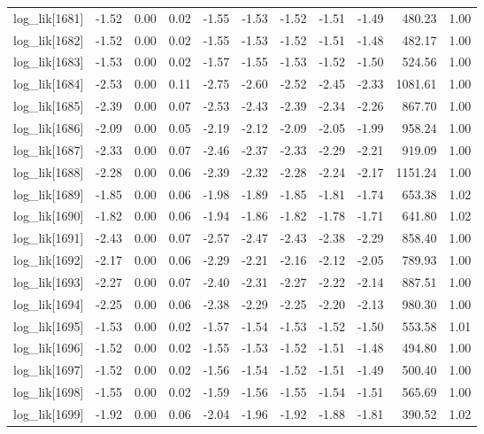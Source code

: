 \begin{table}[ht]
\begin{tabular}{rrrrrrrrrrr}
  log\_lik[1681] & -1.52 & 0.00 & 0.02 & -1.55 & -1.53 & -1.52 & -1.51 & -1.49 & 480.23 & 1.00 \\ 
  log\_lik[1682] & -1.52 & 0.00 & 0.02 & -1.55 & -1.53 & -1.52 & -1.51 & -1.48 & 482.17 & 1.00 \\ 
  log\_lik[1683] & -1.53 & 0.00 & 0.02 & -1.57 & -1.55 & -1.53 & -1.52 & -1.50 & 524.56 & 1.00 \\ 
  log\_lik[1684] & -2.53 & 0.00 & 0.11 & -2.75 & -2.60 & -2.52 & -2.45 & -2.33 & 1081.61 & 1.00 \\ 
  log\_lik[1685] & -2.39 & 0.00 & 0.07 & -2.53 & -2.43 & -2.39 & -2.34 & -2.26 & 867.70 & 1.00 \\ 
  log\_lik[1686] & -2.09 & 0.00 & 0.05 & -2.19 & -2.12 & -2.09 & -2.05 & -1.99 & 958.24 & 1.00 \\ 
  log\_lik[1687] & -2.33 & 0.00 & 0.07 & -2.46 & -2.37 & -2.33 & -2.29 & -2.21 & 919.09 & 1.00 \\ 
  log\_lik[1688] & -2.28 & 0.00 & 0.06 & -2.39 & -2.32 & -2.28 & -2.24 & -2.17 & 1151.24 & 1.00 \\ 
  log\_lik[1689] & -1.85 & 0.00 & 0.06 & -1.98 & -1.89 & -1.85 & -1.81 & -1.74 & 653.38 & 1.02 \\ 
  log\_lik[1690] & -1.82 & 0.00 & 0.06 & -1.94 & -1.86 & -1.82 & -1.78 & -1.71 & 641.80 & 1.02 \\ 
  log\_lik[1691] & -2.43 & 0.00 & 0.07 & -2.57 & -2.47 & -2.43 & -2.38 & -2.29 & 858.40 & 1.00 \\ 
  log\_lik[1692] & -2.17 & 0.00 & 0.06 & -2.29 & -2.21 & -2.16 & -2.12 & -2.05 & 789.93 & 1.00 \\ 
  log\_lik[1693] & -2.27 & 0.00 & 0.07 & -2.40 & -2.31 & -2.27 & -2.22 & -2.14 & 887.51 & 1.00 \\ 
  log\_lik[1694] & -2.25 & 0.00 & 0.06 & -2.38 & -2.29 & -2.25 & -2.20 & -2.13 & 980.30 & 1.00 \\ 
  log\_lik[1695] & -1.53 & 0.00 & 0.02 & -1.57 & -1.54 & -1.53 & -1.52 & -1.50 & 553.58 & 1.01 \\ 
  log\_lik[1696] & -1.52 & 0.00 & 0.02 & -1.55 & -1.53 & -1.52 & -1.51 & -1.48 & 494.80 & 1.00 \\ 
  log\_lik[1697] & -1.52 & 0.00 & 0.02 & -1.56 & -1.54 & -1.52 & -1.51 & -1.49 & 500.40 & 1.00 \\ 
  log\_lik[1698] & -1.55 & 0.00 & 0.02 & -1.59 & -1.56 & -1.55 & -1.54 & -1.51 & 565.69 & 1.00 \\ 
  log\_lik[1699] & -1.92 & 0.00 & 0.06 & -2.04 & -1.96 & -1.92 & -1.88 & -1.81 & 390.52 & 1.02 \\ 

\end{tabular}
\end{table}
